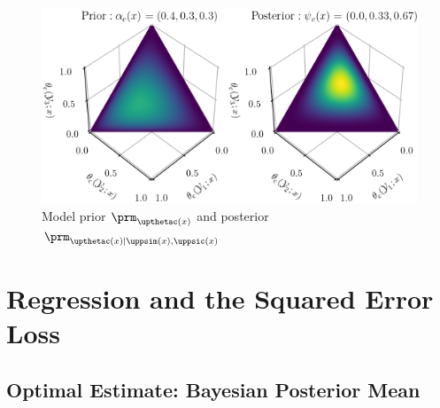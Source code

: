 \documentclass{article}
\begin{document}
	\begin{figure}
		\centering
		\includegraphics[width=1\linewidth]{SSP_2021/P_theta_post.png}
		\caption{Model prior $\prm_{\upthetac(x)}$ and posterior $\prm_{\upthetac(x) | \uppsim(x),\uppsic(x)}$}
		\label{fig:P_theta_post_tilde}
	\end{figure}
	
	
	
	
	
	
	
	
	
	
	
	\section{Regression and the Squared Error Loss}
	
	
	
	\subsection{Optimal Estimate: Bayesian Posterior Mean}
	
\end{document}
